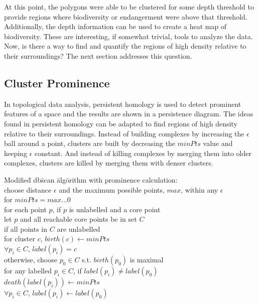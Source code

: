 \documentclass[11pt, fullpage,letterpaper]{article}
\begin{document}
		At this point, the polygons were able to be clustered for some depth threshold to provide regions where biodiversity or endangerment were above that threshold. Additionally, the depth information can be used to create a heat map of biodiversity. These are interesting, if somewhat trivial, tools to analyze the data. Now, is there a way to find and quantify the regions of high density relative to their surroundings? The next section addresses this question.
		
	\subsection{Cluster Prominence}
		In topological data analysis, persistent homology is used to detect prominent features of a space and the results are shown in a persistence diagram. The ideas found in persistent homology can be adapted to find regions of high density relative to their surroundings. Instead of building complexes by increasing the $\epsilon$ ball around a point, clusters are built by decreasing the $minPts$ value and keeping $\epsilon$ constant. And instead of killing complexes by merging them into older complexes, clusters are killed by merging them with denser clusters.
		
		\begin{tabbing}
			Mod\= ifie\= d db\= scan \= alg\= orithm with prominence calculation:\\
			\> choose distance $\epsilon$ and the maximum possible points, $max$, within any $\epsilon$\\
			\> for $minPts = max... 0$\\
			\> \> for each point $p$, if $p$ is unlabelled and a core point\\
			\> \> \> let $p$ and all reachable core points be in set $C$\\
			\> \> \> \> if all points in $C$ are unlabelled\\
			\> \> \> \> \> for cluster $c$, $birth(c) \leftarrow minPts$\\
			\> \> \> \> \> $\forall p_i \in C$, $label(p_i) = c$\\
			\> \> \> otherwise, choose $p_0 \in C$ s.t. $birth(p_0)$ is maximal\\
			\> \> \> \> for any labelled $p_i \in C$, if $label(p_i) \neq label(p_0)$\\
			\> \> \> \> \> $death(label(p_i)) \leftarrow minPts$\\
			\> \> \> \> \> $\forall p_i \in C$, $label(p_i) \leftarrow label(p_0)$\\
		\end{tabbing}
		
\end{document}
